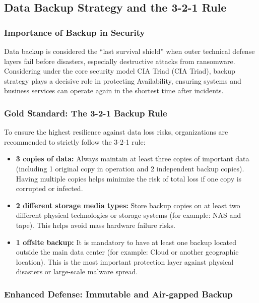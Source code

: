 \subsection{Data Backup Strategy and the 3-2-1 Rule}

\subsubsection{Importance of Backup in Security}

Data backup is considered the ``last survival shield'' when outer technical defense layers fail before disasters, especially destructive attacks from ransomware. Considering under the core security model CIA Triad (CIA Triad), backup strategy plays a decisive role in protecting Availability, ensuring systems and business services can operate again in the shortest time after incidents.

\subsubsection{Gold Standard: The 3-2-1 Backup Rule}

To ensure the highest resilience against data loss risks, organizations are recommended to strictly follow the 3-2-1 rule:

\begin{itemize}
    \item \textbf{3 copies of data:} Always maintain at least three copies of important data (including 1 original copy in operation and 2 independent backup copies). Having multiple copies helps minimize the risk of total loss if one copy is corrupted or infected.
    
    \item \textbf{2 different storage media types:} Store backup copies on at least two different physical technologies or storage systems (for example: NAS and tape). This helps avoid mass hardware failure risks.
    
    \item \textbf{1 offsite backup:} It is mandatory to have at least one backup located outside the main data center (for example: Cloud or another geographic location). This is the most important protection layer against physical disasters or large-scale malware spread.
\end{itemize}

\subsubsection{Enhanced Defense: Immutable and Air-gapped Backup}

